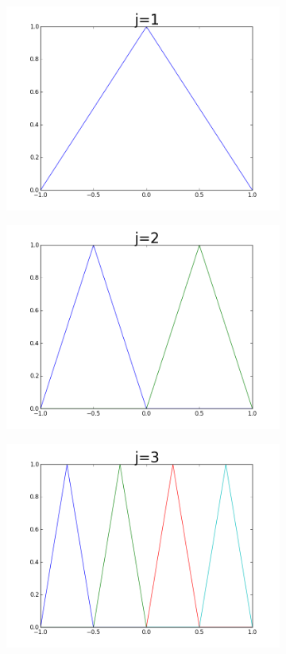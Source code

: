 \begin{center}
\begin{figure}
\begin{subfigure}{.49\textwidth}
\includegraphics[width=\textwidth]{j1.png}
\end{subfigure}
\begin{subfigure}{.49\textwidth}
\includegraphics[width=\textwidth]{j2.png}
\end{subfigure}
\begin{subfigure}{.49\textwidth}
\includegraphics[width=\textwidth]{j3.png}

\end{subfigure}
\end{figure}
\end{center}
